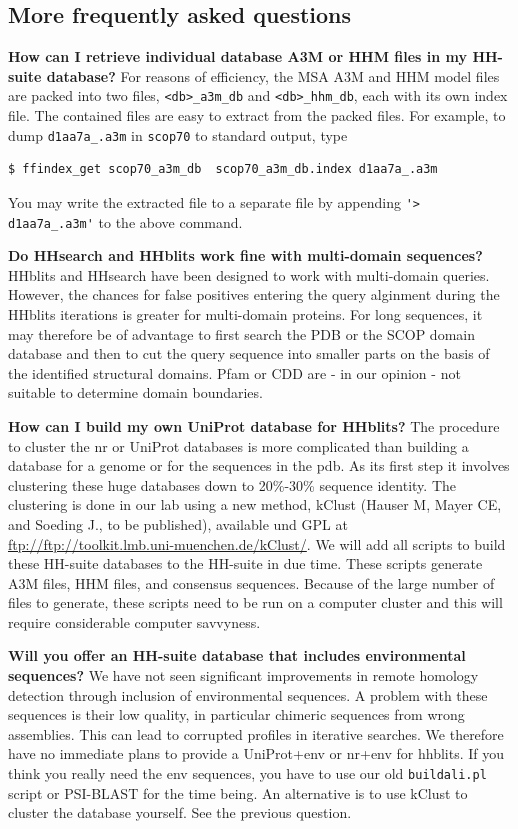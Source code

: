 \documentclass[11pt,a4paper]{article}
\begin{document}
\subsection{More frequently asked questions}

{\bf How can I retrieve individual database A3M or HHM files in my HH-suite database?}
For reasons of efficiency, the MSA A3M and HHM model files are packed into two files, \verb`<db>_a3m_db` and \verb`<db>_hhm_db`, each with its own index file. The contained files are easy to extract from the packed files. For example, to dump \verb`d1aa7a_.a3m` in \verb`scop70` to standard output, type 
\begin{verbatim}
$ ffindex_get scop70_a3m_db  scop70_a3m_db.index d1aa7a_.a3m
\end{verbatim}
You may write the extracted file to a separate file by appending \verb`'> d1aa7a_.a3m'` to the above command.


{\bf Do HHsearch and HHblits work fine with multi-domain sequences?}
HHblits and HHsearch have been designed to work with multi-domain queries. However, the chances for false positives entering the query alginment during the HHblits iterations is greater for multi-domain proteins. For long sequences, it may therefore be of advantage to first search the PDB or the SCOP domain database and then to cut the query sequence into smaller parts on the basis of the identified structural domains. Pfam or CDD are - in our opinion - not suitable to determine domain boundaries.

{\bf How can I build my own UniProt database for HHblits?}
The procedure to cluster the nr or UniProt databases is more complicated than building a database for a genome or for the sequences in the pdb. As its first step it involves clustering these huge databases down to 20\%-30\% sequence identity. The clustering is done in our lab using a new method, kClust (Hauser M, Mayer CE, and Soeding J., to be published), available und GPL at \url{ftp://ftp://toolkit.lmb.uni-muenchen.de/kClust/}. We will add all scripts to build these HH-suite databases to the HH-suite in due time. These scripts generate A3M files, HHM files, and consensus sequences. Because of the large number of files to generate, these scripts need to be run on a computer cluster and this will require considerable computer savvyness. 

{\bf Will you offer an HH-suite database that includes environmental sequences?}
We have not seen significant improvements in remote homology detection through inclusion of environmental sequences. A problem with these sequences is their low quality, in particular chimeric sequences from wrong assemblies. This can lead to corrupted profiles in iterative searches. We therefore have no immediate plans to provide a UniProt+env or nr+env for hhblits. If you think you really need the env sequences, you have to use our old \verb`buildali.pl` script or PSI-BLAST for the time being. An alternative is to use kClust to cluster the database yourself. See the previous question.
\end{document}
